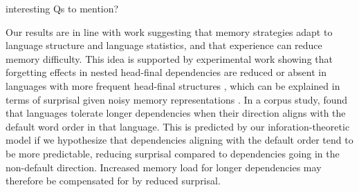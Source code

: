 



interesting Qs to mention?



Our results are in line with work suggesting that memory strategies adapt to language structure and language statistics, and that experience can reduce memory difficulty.
This idea is supported by experimental work showing that forgetting effects in nested head-final dependencies are reduced or absent in languages with more frequent head-final structures  \cite{macdonald2002reassessing, christiansen1999toward; christiansen2009usage; engelmann2009processing, frank2019judgements, frank2016cross, vasishth2010short}, which can be explained in terms of surprisal given noisy memory representations \cite{futrell-noisy-context-2017}.
In a corpus study, \cite{yadav2020word} found that languages tolerate longer dependencies when their direction aligns with the default word order in that language. This is predicted by our inforation-theoretic model if we hypothesize that dependencies aligning with the default order tend to be more predictable, reducing surprisal compared to dependencies going in the non-default direction. Increased memory load for longer dependencies may therefore be compensated for by reduced surprisal.



